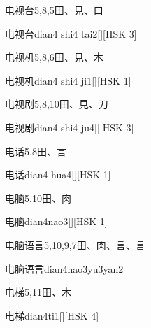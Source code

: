 \begin{entry}{电视台}{5,8,5}{⽥、⾒、⼝}
  \begin{phonetics}{电视台}{dian4 shi4 tai2}[][HSK 3]
  \end{phonetics}
\end{entry}

\begin{entry}{电视机}{5,8,6}{⽥、⾒、⽊}
  \begin{phonetics}{电视机}{dian4 shi4 ji1}[][HSK 1]
  \end{phonetics}
\end{entry}

\begin{entry}{电视剧}{5,8,10}{⽥、⾒、⼑}
  \begin{phonetics}{电视剧}{dian4 shi4 ju4}[][HSK 3]
  \end{phonetics}
\end{entry}

\begin{entry}{电话}{5,8}{⽥、⾔}
  \begin{phonetics}{电话}{dian4 hua4}[][HSK 1]
  \end{phonetics}
\end{entry}

\begin{entry}{电脑}{5,10}{⽥、⾁}
  \begin{phonetics}{电脑}{dian4nao3}[][HSK 1]
  \end{phonetics}
\end{entry}

\begin{entry}{电脑语言}{5,10,9,7}{⽥、⾁、⾔、⾔}
  \begin{phonetics}{电脑语言}{dian4nao3yu3yan2}
  \end{phonetics}
\end{entry}

\begin{entry}{电梯}{5,11}{⽥、⽊}
  \begin{phonetics}{电梯}{dian4ti1}[][HSK 4]
  \end{phonetics}
\end{entry}

